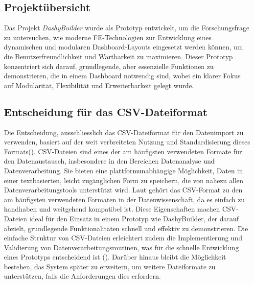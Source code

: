 \documentclass[a4paper, 12pt]{scrartcl}
\begin{document}
{\subsection{Projektübersicht}}

Das Projekt \textit{DashyBuilder} wurde als Prototyp entwickelt, um die Forschungsfrage zu untersuchen, wie moderne \ac{FE}-Technologien zur Entwicklung eines dynamischen und modularen Dashboard-Layouts eingesetzt werden können, um die Benutzerfreundlichkeit und Wartbarkeit zu maximieren. Dieser Prototyp konzentriert sich darauf, grundlegende, aber essenzielle Funktionen zu demonstrieren, die in einem Dashboard notwendig sind, wobei ein klarer Fokus auf Modularität, Flexibilität und Erweiterbarkeit gelegt wurde.

\subsection{Entscheidung für das CSV-Dateiformat}
Die Entscheidung, ausschliesslich das \ac{CSV}-Dateiformat für den Datenimport zu verwenden, basiert auf der weit verbreiteten Nutzung und Standardisierung dieses Formats(\cite{Connelly2014}). \ac{CSV}-Dateien sind eines der am häufigsten verwendeten Formate für den Datenaustausch, insbesondere in den Bereichen Datenanalyse und Datenverarbeitung. Sie bieten eine plattformunabhängige Möglichkeit, Daten in einer textbasierten, leicht zugänglichen Form zu speichern, die von nahezu allen Datenverarbeitungstools unterstützt wird. Laut \textcite{Burg2019} gehört das \ac{CSV}-Format zu den am häufigsten verwendeten Formaten in der Datenwissenschaft, da es einfach zu handhaben und weitgehend kompatibel ist. Diese Eigenschaften machen \ac{CSV}-Dateien ideal für den Einsatz in einem Prototyp wie DashyBuilder, der darauf abzielt, grundlegende Funktionalitäten schnell und effektiv zu demonstrieren. Die einfache Struktur von \ac{CSV}-Dateien erleichtert zudem die Implementierung und Validierung von Datenverarbeitungsroutinen, was für die schnelle Entwicklung eines Prototyps entscheidend ist (\cite{Tapsai2018}). Darüber hinaus bleibt die Möglichkeit bestehen, das System später zu erweitern, um weitere Dateiformate zu unterstützen, falls die Anforderungen dies erfordern.
\end{document}
